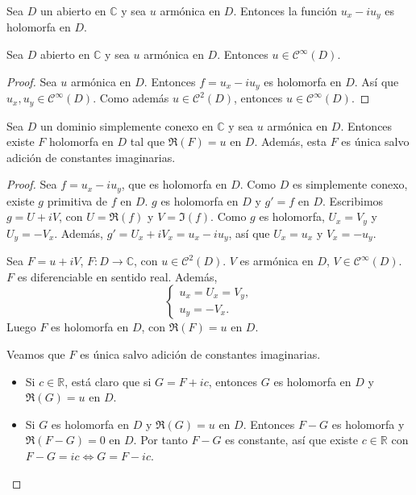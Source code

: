 \begin{proposition}
    Sea $D$ un abierto en $\mathbb{C}$ y sea $u$ armónica en $D$.
    Entonces la función $u_x - iu_y$ es holomorfa en $D$.
\end{proposition}

\begin{corollary}
    Sea $D$ abierto en $\mathbb{C}$ y sea $u$ armónica en $D$.
    Entonces $u \in \mathcal{C}^\infty(D)$.
\end{corollary}

\begin{proof}
    Sea $u$ armónica en $D$.
    Entonces $f = u_x - iu_y$ es holomorfa en $D$.
    Así que $u_x, u_y \in \mathcal{C}^\infty(D)$.
    Como además $u \in \mathcal{C}^2(D)$, entonces $u \in \mathcal{C}^\infty(D)$.
\end{proof}

\begin{proposition}
    Sea $D$ un dominio simplemente conexo en $\mathbb{C}$ y sea $u$ armónica en $D$.
    Entonces existe $F$ holomorfa en $D$ tal que $\Re(F) = u$ en $D$.
    Además, esta $F$ es única salvo adición de constantes imaginarias.
\end{proposition}

\begin{proof}
    Sea $f = u_x - iu_y$, que es holomorfa en $D$.
    Como $D$ es simplemente conexo, existe $g$ primitiva de $f$ en $D$.
    $g$ es holomorfa en $D$ y $g' = f$ en $D$.
    Escribimos $g = U + iV$, con $U = \Re(f)$ y $V = \Im(f)$.
    Como $g$ es holomorfa, $U_x = V_y$ y $U_y = -V_x$.
    Además, $g' = U_x + iV_x = u_x - iu_y$, así que $U_x = u_x$ y $V_x = -u_y$.

    Sea $F = u + iV$, $F: D \to \mathbb{C}$, con $u \in \mathcal{C}^2(D)$.
    $V$ es armónica en $D$, $V \in \mathcal{C}^\infty(D)$.
    $F$ es diferenciable en sentido real.
    Además,
    $$\begin{cases}
            u_x = U_x = V_y, \\
            u_y = -V_x.
        \end{cases}$$
    Luego $F$ es holomorfa en $D$, con $\Re(F) = u$ en $D$.

    Veamos que $F$ es única salvo adición de constantes imaginarias.
    \begin{itemize}
        \item Si $c \in \mathbb{R}$, está claro que si $G = F + ic$, entonces $G$ es holomorfa en $D$ y $\Re(G) = u$ en $D$.
        \item Si $G$ es holomorfa en $D$ y $\Re(G) = u$ en $D$.
              Entonces $F-G$ es holomorfa y $\Re(F-G) = 0$ en $D$.
              Por tanto $F-G$ es constante, así que existe $c \in \mathbb{R}$ con $F-G = ic \Leftrightarrow G = F - ic$.
    \end{itemize}
\end{proof}

